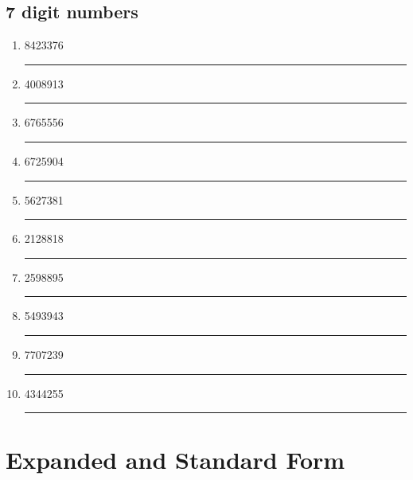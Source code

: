 \documentclass[11pt]{article}
\begin{document}
\subsection{7 digit numbers}
\begin{enumerate}
    \item 8423376 \\
    \rule{0cm}{20pt}\rule[0cm]{10cm}{0.4pt}
    \item 4008913 \\
    \rule{0cm}{20pt}\rule[0cm]{10cm}{0.4pt}
    \item 6765556 \\
    \rule{0cm}{20pt}\rule[0cm]{10cm}{0.4pt}
    \item 6725904 \\
    \rule{0cm}{20pt}\rule[0cm]{10cm}{0.4pt}
    \item 5627381 \\
    \rule{0cm}{20pt}\rule[0cm]{10cm}{0.4pt}
    \item 2128818 \\
    \rule{0cm}{20pt}\rule[0cm]{10cm}{0.4pt}
    \item 2598895 \\
    \rule{0cm}{20pt}\rule[0cm]{10cm}{0.4pt}
    \item 5493943 \\
    \rule{0cm}{20pt}\rule[0cm]{10cm}{0.4pt}
    \item 7707239 \\
    \rule{0cm}{20pt}\rule[0cm]{10cm}{0.4pt}
    \item 4344255 \\
    \rule{0cm}{20pt}\rule[0cm]{10cm}{0.4pt}
\end{enumerate}

\newpage

\section{Expanded and Standard Form}
\end{document}
